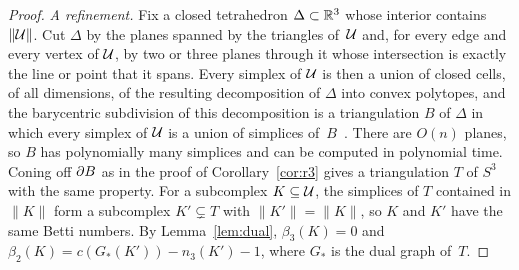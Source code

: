 \begin{proof}
\emph{A refinement.}
Fix a closed tetrahedron $\Delta\subset\mathbb{R}^3$ whose interior contains $\lVert\mathcal{U}\rVert$.
Cut $\Delta$ by the planes spanned by the triangles of~$\mathcal{U}$ and, for every edge and every vertex of $\mathcal{U}$, by two or three planes through it whose intersection is exactly the line or point that it spans.
Every simplex of $\mathcal{U}$ is then a union of closed cells, of all dimensions, of the resulting decomposition of $\Delta$ into convex polytopes, and the barycentric subdivision of this decomposition is a triangulation $B$ of $\Delta$ in which every simplex of $\mathcal{U}$ is a union of simplices of~$B$~\cite{Mun84}.
There are $O(n)$ planes, so $B$ has polynomially many simplices and can be computed in polynomial time.
Coning off $\partial B$ as in the proof of Corollary~\ref{cor:r3} gives a triangulation $T$ of $S^3$ with the same property.
For a subcomplex $K\subseteq\mathcal{U}$, the simplices of $T$ contained in $\lVert K\rVert$ form a subcomplex $K'\subsetneq T$ with $\lVert K'\rVert=\lVert K\rVert$, so $K$ and $K'$ have the same Betti numbers.
By Lemma~\ref{lem:dual}, $\beta_3(K)=0$ and $\beta_2(K)=c(G_\ast(K'))-n_3(K')-1$, where $G_\ast$ is the dual graph of~$T$.


\end{proof}

